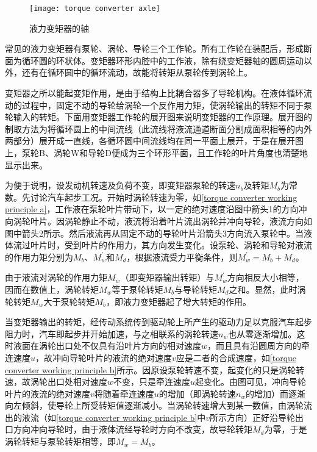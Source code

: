 \documentclass[UTF8]{ctexart}
\numberwithin{figure}{section}
\numberwithin{table}{section}
\begin{document}
\begin{figure}[htbp]
	\centering
	\begin{minipage}[b]{0.5\textwidth}
		\centering
		\texttt{[image: torque converter axle]}
		\caption{液力变矩器的轴}
		\label{torque converter axle}
	\end{minipage}
\end{figure}

常见的液力变矩器有泵轮、涡轮、导轮三个工作轮。所有工作轮在装配后，形成断面为循环圆的环状体。变矩器环形内腔中的工作液，除有绕变矩器轴的圆周运动以外，还有在循环圆中的循环流动，故能将转矩从泵轮传到涡轮上。

变矩器之所以能起变矩作用，是由于结构上比耦合器多了导轮机构。在液体循环流动的过程中，固定不动的导轮给涡轮一个反作用力矩，使涡轮输出的转矩不同于泵轮输入的转矩。下面用变矩器工作轮的展开图来说明变矩器的工作原理。展开图的制取方法为将循环圆上的中间流线（此流线将液流通道断面分割成面积相等的内外两部分）展开成一直线，各循环圆中间流线均在同一平面上展开，于是在展开图上，泵轮B、涡轮W和导轮D便成为三个环形平面，且工作轮的叶片角度也清楚地显示出来。

为便于说明，设发动机转速及负荷不变，即变矩器泵轮的转速$n_b$及转矩$M_b$为常数。先讨论汽车起步工况。开始时涡轮转速为零，如\cref{torque converter working principle a}，工作液在泵轮叶片带动下，以一定的绝对速度沿图中箭头1的方向冲向涡轮叶片。因涡轮静止不动，液流将沿着叶片流出涡轮并冲向导轮，液流方向如图中箭头2所示。然后液流再从固定不动的导轮叶片沿箭头3方向流入泵轮中。当液体流过叶片时，受到叶片的作用力，其方向发生变化。设泵轮、涡轮和导轮对液流的作用力矩分别为$M_b$、$M_w^{\prime}$和$M_d$，根据液流受力平衡条件，则$M_w^{\prime} = M_b+M_d$。

由于液流对涡轮的作用力矩$M_w$（即变矩器输出转矩）与$M_w^{\prime}$方向相反大小相等，因而在数值上，涡轮转矩$M_w$等于泵轮转矩$M_b$与导轮转矩$M_d$之和。显然，此时涡轮转矩$M_w$大于泵轮转矩$M_b$，即液力变矩器起了增大转矩的作用。

当变矩器输出的转矩，经传动系统传到驱动轮上所产生的驱动力足以克服汽车起步阻力时，汽车即起步并开始加速，与之相联系的涡轮转速$n_w$也从零逐渐增加。这时液面在涡轮出口处不仅具有沿叶片方向的相对速度$w$，而且具有沿圆周方向的牵连速度$u$，故冲向导轮叶片的液流的绝对速度$v$应是二者的合成速度，如\cref{torque converter working principle b}所示。因原设泵轮转速不变，起变化的只是涡轮转速，故涡轮出口处相对速度$w$不变，只是牵连速度$u$起变化。由图可见，冲向导轮叶片的液流的绝对速度$v$将随着牵连速度$u$的增加（即涡轮转速$n_w$的增加）而逐渐向左倾斜，使导轮上所受转矩值逐渐减小。当涡轮转速增大到某一数值，由涡轮流出的液流（如\cref{torque converter working principle b}中$v$所示方向）正好沿导轮出口方向冲向导轮时，由于液体流经导轮时方向不改变，故导轮转矩$M_d$为零，于是涡轮转矩与泵轮转矩相等，即$M_w = M_b$。
\end{document}

